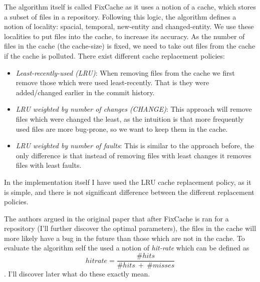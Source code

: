 \documentclass[12pt,twoside,notitlepage]{report}
\newcommand{\fxch}{FixCache }
\begin{document}
The algorithm itself is called \fxch as it uses a notion of a cache, which stores a subset of files in a repository. Following this logic, the algorithm defines a notion of locality: spacial, temporal, new-entity and changed-entity. We use these localities to put files into the cache, to increase its accuracy. As the number of files in the cache (the cache-size) is fixed, we need to take out files from the cache if the cache is polluted. There exist different cache replacement policies\cite{FixCache}:
\begin{itemize}
\item \textit{Least-recently-used (LRU)}: When removing files from the cache we first remove those which were used least-recently. That is they were added/changed earlier in the commit history.
\item \textit{LRU weighted by number of changes (CHANGE)}: This approach will remove files which were changed the least, as the intuition is that more frequently used files are more bug-prone, so we want to keep them in the cache.
\item \textit{LRU weighted by number of faults}: This is similar to the approach before, the only difference is that instead of removing files with least changes it removes files with least faults.
\end{itemize}
In the implementation itself I have used the LRU cache replacement policy, as it is simple, and there is not significant difference between the different replacement policies\cite{FixCache}\cite{Sadowski}\cite{Bugcache}.

The authors argued in the original paper that after \fxch is ran for a repository (I'll further discover the optimal parameters), the files in the cache will more likely have a bug in the future than those which are not in the cache. To evaluate the algorithm self the used a notion of \textit{hit-rate} which can be defined as \[hitrate = \frac{\#hits}{\#hits\ +\ \#misses}\].
I'll discover later what do these exactly mean.
\end{document}

